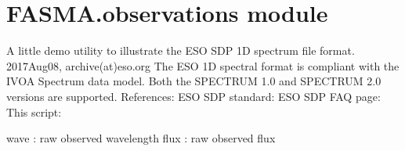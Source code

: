 \documentclass[letterpaper,10pt,english]{sphinxmanual}
\begin{document}
\begin{fulllineitems}

\begin{fulllineitems}
\label{\detokenize{index:FASMA.mpfit.mpfit.qrfac}}
\end{fulllineitems}


\begin{fulllineitems}
\label{\detokenize{index:FASMA.mpfit.mpfit.qrsolv}}
\end{fulllineitems}


\begin{fulllineitems}
\label{\detokenize{index:FASMA.mpfit.mpfit.tie}}
\end{fulllineitems}


\end{fulllineitems}



\section{FASMA.observations module}
\label{\detokenize{index:module-FASMA.observations}}\label{\detokenize{index:fasma-observations-module}}

\begin{fulllineitems}
\label{\detokenize{index:FASMA.observations.eso_fits}}
A little demo utility to illustrate the ESO SDP 1D spectrum file format.
2017\sphinxhyphen{}Aug\sphinxhyphen{}08, archive(at)eso.org
The ESO 1D spectral format is compliant with the IVOA Spectrum data model.
Both the SPECTRUM 1.0 and SPECTRUM 2.0 versions are supported.
References:
ESO SDP standard: 
ESO SDP FAQ page: 
This script:      

wave : raw observed wavelength
flux : raw observed flux

\end{fulllineitems}
\end{document}
